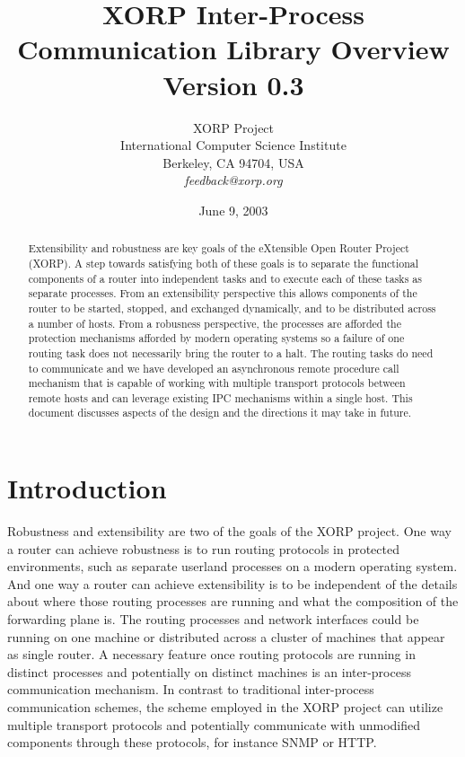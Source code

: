 \documentclass[11pt]{article}
\title{
XORP Inter-Process Communication Library Overview \\
\vspace{1ex} Version 0.3
}
\author{ XORP Project					\\
	 International Computer Science Institute	\\
	 Berkeley, CA 94704, USA			\\
	 {\it feedback@xorp.org}
}
\date{June 9, 2003}
\begin{document}
\maketitle
\begin{abstract}

Extensibility and robustness are key goals of the eXtensible Open
Router Project (XORP).  A step towards satisfying both of these goals
is to separate the functional components of a router into independent
tasks and to execute each of these tasks as separate processes.  From
an extensibility perspective this allows components of the router to
be started, stopped, and exchanged dynamically, and to be distributed
across a number of hosts.  From a robusness perspective, the processes
are afforded the protection mechanisms afforded by modern operating
systems so a failure of one routing task does not necessarily bring
the router to a halt. The routing tasks do need to communicate and we
have developed an asynchronous remote procedure call mechanism that is
capable of working with multiple transport protocols between remote
hosts and can leverage existing IPC mechanisms within a single
host. This document discusses aspects of the design and the directions
it may take in future.
\end{abstract}

\section{Introduction}

Robustness and extensibility are two of the goals of the XORP project.
One way a router can achieve robustness is to run routing protocols in
protected environments, such as separate userland processes on a
modern operating system.  And one way a router can achieve
extensibility is to be independent of the details about where those
routing processes are running and what the composition of the
forwarding plane is.  The routing processes and network interfaces
could be running on one machine or distributed across a cluster of
machines that appear as single router.  A necessary feature once
routing protocols are running in distinct processes and potentially on
distinct machines is an inter-process communication mechanism.  In
contrast to traditional inter-process communication schemes, the
scheme employed in the XORP project can utilize multiple transport
protocols and potentially communicate with unmodified components
through these protocols, for instance SNMP or HTTP.
\end{document}
